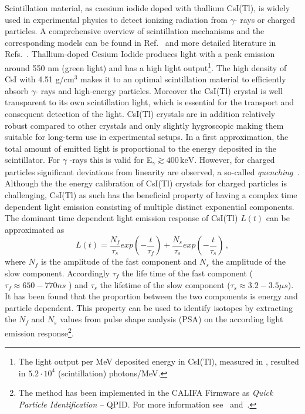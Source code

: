 Scintillation material, as caesium iodide doped with thallium CsI(Tl), is widely used in experimental physics to detect ionizing radiation from $\gamma$- rays or charged particles. A comprehensive overview of scintillation mechanisms and the corresponding models can be found in Ref.~\cite{bendel2014entwicklung} and more detailed literature in Refs.~\cite{murray1961scintillation,zazubovich2001physics}.\newline
Thallium-doped Cesium Iodide produces light with a peak emission around 550 nm (green light) and has a high light output\footnote{The light output per MeV deposited energy in CsI(Tl), measured in \cite{holl1988measurement}, resulted in  $5.2\cdot10^{4}$ (scintillation) photons/MeV.}. The high density of CsI with 4.51 g/cm$^3$ makes it to an optimal scintillation material to efficiently absorb $\gamma$- rays and high-energy particles. Moreover the CsI(Tl) crystal is well transparent to its own scintillation light, which is essential for the transport and consequent  detection of the light. CsI(Tl) crystals are in addition relatively robust compared to other crystals and only slightly hygroscopic making them suitable for long-term use in experimental setups.\newline
In a first approximation, the total amount of emitted light is proportional to the energy deposited in the scintillator. For $\gamma$ -rays this is valid for E$_{\gamma} \gtrsim 400\,\mathrm{keV}$\cite{syntfeld2007non}. However, for charged particles significant deviations from linearity are observed, a so-called \textit{quenching}~\cite{murray1961scintillation}.\newline
Although the the energy calibration of CsI(Tl) crystals for charged particles is challenging, CsI(Tl) as such  has the beneficial property of having a complex time dependent light emission consisting of multiple distinct exponential components. The dominant time dependent light emission response of CsI(Tl) $L(t)$ can be approximated as
\begin{equation}
L(t) = \frac{N_f}{\tau_s} exp(-\frac{t}{\tau_f}) + \frac{N_s}{\tau_s} exp(-\frac{t}{\tau_s}) \, ,
\end{equation}
where $N_{f}$ is the amplitude of the fast component and $N_{s}$ the amplitude of the slow component. Accordingly $\tau_{f}$ the life time of the fast component ($\tau_{f} \approx 650-770 ns$ ) and $\tau_{s}$ the lifetime of the slow component ($\tau_{s} \approx 3.2 - 3.5\mu s$). It has been found that the proportion between the two components is energy and particle dependent. This property can be used to identify isotopes by extracting the $N_{f}$ and $N_{s}$ values from pulse shape analysis (PSA) on the according light emission response\footnote{The method has been implemented in the CALIFA Firmware as \textit{Quick Particle Identification} -- QPID. For more information see~\cite{winkel2011implementierung} and~\cite{winkel2016komplexe}.}.\\[1em]
